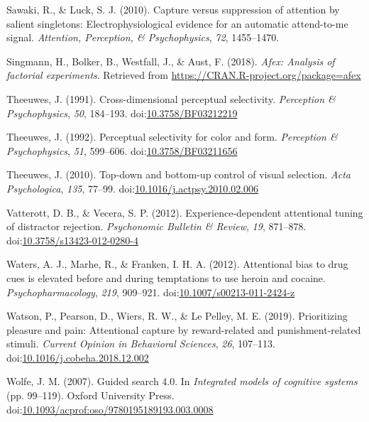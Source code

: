 \documentclass[jou, a4paper, noextraspace,floatsintext]{apa6}
\theoremstyle{definition}
\theoremstyle{definition}
\theoremstyle{definition}
\theoremstyle{remark}
\begin{document}
\hypertarget{ref-Sawaki2010}{}
Sawaki, R., \& Luck, S. J. (2010). Capture versus suppression of
attention by salient singletons: Electrophysiological evidence for an
automatic attend-to-me signal. \emph{Attention, Perception, \&
Psychophysics}, \emph{72}, 1455--1470.

\hypertarget{ref-R-afex}{}
Singmann, H., Bolker, B., Westfall, J., \& Aust, F. (2018). \emph{Afex:
Analysis of factorial experiments}. Retrieved from
\url{https://CRAN.R-project.org/package=afex}

\hypertarget{ref-Theeuwes1991a}{}
Theeuwes, J. (1991). Cross-dimensional perceptual selectivity.
\emph{Perception \& Psychophysics}, \emph{50}, 184--193.
doi:\href{https://doi.org/10.3758/BF03212219}{10.3758/BF03212219}

\hypertarget{ref-Theeuwes1992}{}
Theeuwes, J. (1992). Perceptual selectivity for color and form.
\emph{Perception \& Psychophysics}, \emph{51}, 599--606.
doi:\href{https://doi.org/10.3758/BF03211656}{10.3758/BF03211656}

\hypertarget{ref-Theeuwes2010}{}
Theeuwes, J. (2010). Top-down and bottom-up control of visual selection.
\emph{Acta Psychologica}, \emph{135}, 77--99.
doi:\href{https://doi.org/10.1016/j.actpsy.2010.02.006}{10.1016/j.actpsy.2010.02.006}

\hypertarget{ref-Vatterott2012}{}
Vatterott, D. B., \& Vecera, S. P. (2012). Experience-dependent
attentional tuning of distractor rejection. \emph{Psychonomic Bulletin
\& Review}, \emph{19}, 871--878.
doi:\href{https://doi.org/10.3758/s13423-012-0280-4}{10.3758/s13423-012-0280-4}

\hypertarget{ref-Waters2012}{}
Waters, A. J., Marhe, R., \& Franken, I. H. A. (2012). Attentional bias
to drug cues is elevated before and during temptations to use heroin and
cocaine. \emph{Psychopharmacology}, \emph{219}, 909--921.
doi:\href{https://doi.org/10.1007/s00213-011-2424-z}{10.1007/s00213-011-2424-z}

\hypertarget{ref-Watson2019}{}
Watson, P., Pearson, D., Wiers, R. W., \& Le Pelley, M. E. (2019).
Prioritizing pleasure and pain: Attentional capture by reward-related
and punishment-related stimuli. \emph{Current Opinion in Behavioral
Sciences}, \emph{26}, 107--113.
doi:\href{https://doi.org/10.1016/j.cobeha.2018.12.002}{10.1016/j.cobeha.2018.12.002}

\hypertarget{ref-Wolfe2007}{}
Wolfe, J. M. (2007). Guided search 4.0. In \emph{Integrated models of
cognitive systems} (pp. 99--119). Oxford University Press.
doi:\href{https://doi.org/10.1093/acprof:oso/9780195189193.003.0008}{10.1093/acprof:oso/9780195189193.003.0008}
\end{document}
